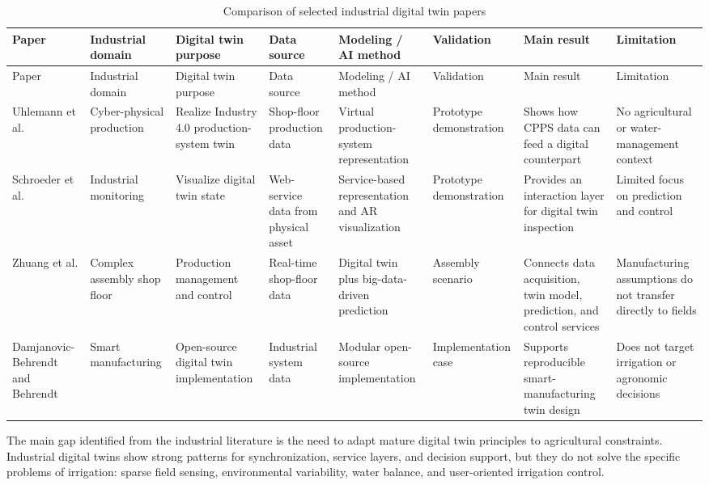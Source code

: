 \begingroup
\scriptsize
\setlength{\tabcolsep}{1pt}
\begin{longtable}{@{}>{\raggedright\arraybackslash}p{}>{\raggedright\arraybackslash}p{}>{\raggedright\arraybackslash}p{}>{\raggedright\arraybackslash}p{}>{\raggedright\arraybackslash}p{}>{\raggedright\arraybackslash}p{}>{\raggedright\arraybackslash}p{}>{\raggedright\arraybackslash}p{}@{}}
\caption{Comparison of selected industrial digital twin papers}\\
\toprule
Paper & Industrial domain & Digital twin purpose & Data source & Modeling / AI method & Validation & Main result & Limitation \\
\midrule
\endfirsthead
\toprule
Paper & Industrial domain & Digital twin purpose & Data source & Modeling / AI method & Validation & Main result & Limitation \\
\midrule
\endhead
Uhlemann et al. \cite{uhlemann2017digitalTwinCPPS} & Cyber-physical production & Realize Industry 4.0 production-system twin & Shop-floor production data & Virtual production-system representation & Prototype demonstration & Shows how CPPS data can feed a digital counterpart & No agricultural or water-management context \\
Schroeder et al. \cite{schroeder2016visualisingDigitalTwin} & Industrial monitoring & Visualize digital twin state & Web-service data from physical asset & Service-based representation and AR visualization & Prototype demonstration & Provides an interaction layer for digital twin inspection & Limited focus on prediction and control \\
Zhuang et al. \cite{zhuang2018digitalTwinAssembly} & Complex assembly shop floor & Production management and control & Real-time shop-floor data & Digital twin plus big-data-driven prediction & Assembly scenario & Connects data acquisition, twin model, prediction, and control services & Manufacturing assumptions do not transfer directly to fields \\
Damjanovic-Behrendt and Behrendt \cite{damjanovic2019openSourceDigitalTwins} & Smart manufacturing & Open-source digital twin implementation & Industrial system data & Modular open-source implementation & Implementation case & Supports reproducible smart-manufacturing twin design & Does not target irrigation or agronomic decisions \\
\bottomrule
\end{longtable}
\endgroup

The main gap identified from the industrial literature is the need to adapt mature digital twin principles to agricultural constraints. Industrial digital twins show strong patterns for synchronization, service layers, and decision support, but they do not solve the specific problems of irrigation: sparse field sensing, environmental variability, water balance, and user-oriented irrigation control.
